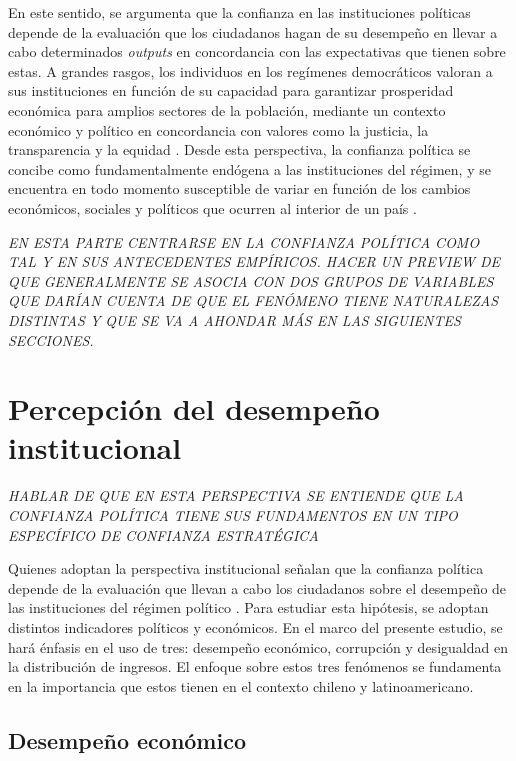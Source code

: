 \documentclass[12pt,twoside]{templates/facsothesis}
\begin{document}
En este sentido, se argumenta que la confianza en las instituciones políticas depende de la evaluación que los ciudadanos hagan de su desempeño en llevar a cabo determinados \emph{outputs} en concordancia con las expectativas que tienen sobre estas. A grandes rasgos, los individuos en los regímenes democráticos valoran a sus instituciones en función de su capacidad para garantizar prosperidad económica para amplios sectores de la población, mediante un contexto económico y político en concordancia con valores como la justicia, la transparencia y la equidad \citep{andersonSensitiveLeftImpervious2008, vandermeerEconomicPerformancePolitical2018, vandermeerDeeplyRootedConcern2017, zmerliPoliticalTrust2022, zmerliIncomeInequalityDistributive2015}. Desde esta perspectiva, la confianza política se concibe como fundamentalmente endógena a las instituciones del régimen, y se encuentra en todo momento susceptible de variar en función de los cambios económicos, sociales y políticos que ocurren al interior de un país \citep{newtonSocialPoliticalTrust2017}.

\emph{EN ESTA PARTE CENTRARSE EN LA CONFIANZA POLÍTICA COMO TAL Y EN SUS ANTECEDENTES EMPÍRICOS. HACER UN PREVIEW DE QUE GENERALMENTE SE ASOCIA CON DOS GRUPOS DE VARIABLES QUE DARÍAN CUENTA DE QUE EL FENÓMENO TIENE NATURALEZAS DISTINTAS Y QUE SE VA A AHONDAR MÁS EN LAS SIGUIENTES SECCIONES.}

\section{Percepción del desempeño institucional}\label{percepciuxf3n-del-desempeuxf1o-institucional}

\emph{HABLAR DE QUE EN ESTA PERSPECTIVA SE ENTIENDE QUE LA CONFIANZA POLÍTICA TIENE SUS FUNDAMENTOS EN UN TIPO ESPECÍFICO DE CONFIANZA ESTRATÉGICA}

Quienes adoptan la perspectiva institucional señalan que la confianza política depende de la evaluación que llevan a cabo los ciudadanos sobre el desempeño de las instituciones del régimen político \citep{vandermeerEconomicPerformancePolitical2018}. Para estudiar esta hipótesis, se adoptan distintos indicadores políticos y económicos. En el marco del presente estudio, se hará énfasis en el uso de tres: desempeño económico, corrupción y desigualdad en la distribución de ingresos. El enfoque sobre estos tres fenómenos se fundamenta en la importancia que estos tienen en el contexto chileno y latinoamericano.

\subsection{Desempeño económico}\label{desempeuxf1o-econuxf3mico}
\end{document}
